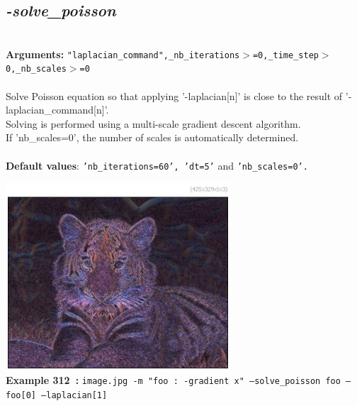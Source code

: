 \documentclass[a4paper,11pt,twoside]{book}
\begin{document}
\subsection{\emph{-solve\_poisson} }\vspace*{-0.5em}
~\\\textbf{Arguments: } 
{\small \texttt{"laplacian\_command",\_nb\_iterations$>$=0,\_time\_step$>$0,\_nb\_scales$>$=0}}\\~\\
Solve Poisson equation so that applying '-laplacian[n]' is close to the result of '-laplacian\_command[n]'.
~\\Solving is performed using a multi-scale gradient descent algorithm.
~\\If 'nb\_scales=0', the number of scales is automatically determined.
~\\~\\\textbf{Default values}: {\small \texttt{'nb\_iterations=60', 'dt=5'} and \texttt{'nb\_scales=0'.}}
\begin{center}\includegraphics[keepaspectratio=true,height=7cm,width=\textwidth]{img/gmic_def312.jpg}\\
{\footnotesize \textbf{Example 312~:} \texttt{image.jpg -m "foo : -gradient x" --solve\_poisson foo --foo[0] --laplacian[1]}}
\end{center}
\end{document}

